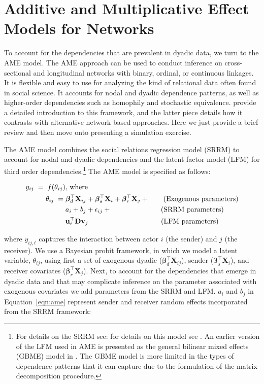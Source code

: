 \section{\textbf{Additive and Multiplicative Effect Models for Networks}}

To account for the dependencies that are prevalent in dyadic data, we turn to the AME model. The AME approach can be used to conduct inference on cross-sectional and longitudinal networks with binary, ordinal, or continuous linkages. It is flexible and easy to use for analyzing the kind of relational data often found in social science. It accounts for nodal and dyadic dependence patterns, as well as higher-order dependencies such as homophily and stochastic equivalence. \citet{hoff:2015:arxiv,minhas:etal:2016:arxiv} provide a detailed introduction to this framework, and the latter piece details how it contrasts with alternative network based approaches. Here we just provide a brief review and then move onto presenting a simulation exercise.

The AME model combines the social relations regression model (SRRM) to account for nodal and dyadic dependencies and the latent factor model (LFM) for third order dependencies.\footnote{For details on the SRRM see: for details on this model see \citet{li:loken:2002,dorff:minhas:2016}. An earlier version of the LFM used in AME is presented as the general bilinear mixed effects (GBME) model in \citet{hoff:ward:2004}. The GBME model is more limited in the types of dependence patterns that it can capture due to the formulation of the matrix decomposition procedure.} The AME model is specified as follows:

\begin{align}
	\begin{aligned}
		y_{ij} \;=\; f(\theta_{ij}) &\text{, where } \\
		\theta_{ij} \;=\;& \bm\beta_{d}^{\top} \mathbf{X}_{ij} + \bm\beta_{s}^{\top} \mathbf{X}_{i} + \bm\beta_{r}^{\top} \mathbf{X}_{j} + \text{\qquad(Exogenous parameters)} \\
		& a_{i} + b_{j} + \epsilon_{ij} + \text{\qquad\qquad\qquad\quad(SRRM parameters)} \\
		& \textbf{u}_{i}^{\top} \textbf{D} \textbf{v}_{j}  \text{\qquad\qquad\qquad\qquad\qquad\;(LFM parameters)} \\ 
	\label{eqn:ame}
	\end{aligned}
\end{align}

where $y_{ij,t}$ captures the interaction between actor $i$ (the sender) and $j$ (the receiver). We use a Bayesian probit framework, in which we model a latent variable, $\theta_{ij}$, using first a set of exogenous dyadic ($\bm\beta_{d}^{\top} \mathbf{X}_{ij}$), sender ($\bm\beta_{s}^{\top} \mathbf{X}_{i}$), and receiver covariates ($\bm\beta_{r}^{\top} \mathbf{X}_{j}$). Next, to account for the dependencies that emerge in dyadic data and that may complicate inference on the parameter associated with exogenous covariates we add parameters from the SRRM and LFM. $a_{i}$ and $b_{j}$ in Equation~\ref{eqn:ame} represent sender and receiver random effects incorporated from the SRRM framework:

